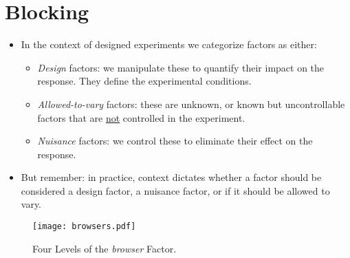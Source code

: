 \chapter{Blocking}
\begin{itemize}
    \item In the context of designed experiments we categorize factors as either:
          \begin{itemize}
              \item \emph{Design} factors: we manipulate these to quantify their impact on the response.
                    They define the experimental conditions.
              \item \emph{Allowed-to-vary} factors: these are unknown, or known but uncontrollable
                    factors that are \underline{not} controlled in the experiment.
              \item \emph{Nuisance} factors: we control these to eliminate their effect on the response.
          \end{itemize}
    \item But remember: in practice, context dictates whether a factor should be considered a design factor, a
          nuisance factor, or if it should be allowed to vary.
\end{itemize}
\begin{figure}[!htbp]
    \centering
    \texttt{[image: browsers.pdf]}
    \caption{Four Levels of the \emph{browser} Factor.}
\end{figure}
